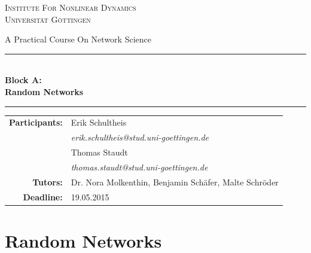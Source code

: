 \documentclass{scrartcl}
\begin{document}
\begin{titlepage}\centering
\textsc{\Large Institute For Nonlinear Dynamics \\[1.5ex] Universität Göttingen}

\vspace*{2cm}
{\huge A Practical Course On Network Science}
\vspace*{2cm}

\rule{\textwidth}{1pt}\\[0.5cm]
{\bfseries \huge Block A: \\[0.5cm] \huge \bfseries Random Networks\\[0.5cm]}
\rule{\textwidth}{1pt}

\vspace*{4cm}

\begin{Large}\begin{tabular}{rl}
        \textbf{Participants:}  & Erik Schultheis                                \\    
                   & \textit{erik.schultheis@stud.uni-goettingen.de}\\[0.5cm]
                   & Thomas Staudt                                  \\
                   & \textit{thomas.staudt@stud.uni-goettingen.de}  \\[1.0cm]

       \textbf{Tutors:}        & Dr. Nora Molkenthin, Benjamin Schäfer, Malte Schröder  \\[1.0cm]
       \textbf{Deadline:}      & 19.05.2015
\end{tabular}\end{Large}

\vspace*{1.5cm}


\end{titlepage}

\tableofcontents
\clearpage

\section{Random Networks}
\end{document}
